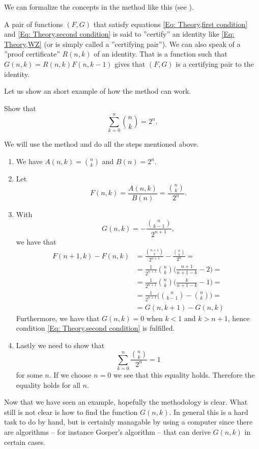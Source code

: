 We can formalize the concepts in the method like this (see ).
\begin{definition}
  A pair of functions $(F,G)$ that satisfy equations \eqref{Eq: Theory,first condition} and \eqref{Eq: Theory,second condition} is said to ''certify'' an identity like \eqref{Eq: Theory,WZ} (or is simply called a ''certifying pair''). We can also speak of a ''proof certificate'' $R(n,k)$ of an identity. That is a function such that $G(n,k)=R(n,k)F(n,k-1)$ gives that $(F,G)$ is a certifying pair to the identity.
\end{definition}
Let us show an short example of how the method can work.
\begin{example}
  Show that $$\sum_{k=0}^n \binom{n}{k} = 2^n.$$
\end{example}
\begin{solution}
  We will use the method and do all the steps mentioned above.
  \begin{enumerate}
    \item We have $A(n,k)=\binom{n}{k}$ and $B(n)=2^n$.
    \item Let $$F(n,k)=\frac{A(n,k)}{B(n)}=\frac{\binom{n}{k}}{2^n}.$$
    \item With $$G(n,k)=-\frac{\binom{n}{k-1}}{2^{n+1}},$$ we have that
      \begin{equation*}
        \begin{split}
          F(n+1,k)-F(n,k) & = \frac{\binom{n+1}{k}}{2^{n+1}}-\frac{\binom{n}{k}}{2^{n}}= \\
          & = \frac{1}{2^{n+1}}\binom{n}{k}\Bigg(\frac{n+1}{n+1-k}-2\Bigg) = \\
          & = \frac{1}{2^{n+1}}\binom{n}{k}\Bigg(\frac{k}{n+1-k}-1\Bigg) = \\
          & = \frac{1}{2^{n+1}}\Bigg(\binom{n}{k-1}-\binom{n}{k}\Bigg) = \\
          & = G(n,k+1)-G(n,k)
        \end{split}
      \end{equation*}
      Furthermore, we have that $G(n,k) = 0$ when $k<1$ and $k>n+1$, hence condition \eqref{Eq: Theory,second condition} is fulfilled.
    \item Lastly we need to show that $$\sum_{k=0}^n \frac{\binom{n}{k}}{2^n}=1$$ for some $n$. If we choose $n=0$ we see that this equality holds. Therefore the equality holds for all $n$.
  \end{enumerate}
\end{solution}
Now that we have seen an example, hopefully the methodology is clear. What still is not clear is how to find the function $G(n,k)$. In general this is a hard task to do by hand, but is certainly managable by using a computer since there are algorithms -- for instance Gosper's algorithm -- that can derive $G(n,k)$ in certain cases.

